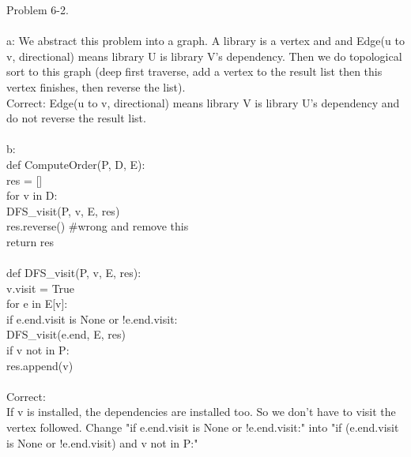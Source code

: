 \documentclass[12pt,twoside]{article}
\begin{document}
Problem 6-2.\\
\\
  a: We abstract this problem into a graph. A library is a vertex and
  and Edge(u to v, directional) means library U is library V's 
  dependency. Then we do topological sort to this graph (deep first 
  traverse, add a vertex to the result list then this vertex finishes,
  then reverse the list).\\
  Correct: Edge(u to v, directional) means library V is library U's 
  dependency and do not reverse the result list.\\
  \\
  b: \\
  \hspace*{2em}def ComputeOrder(P, D, E):\\
  \hspace*{4em}res = []\\
  \hspace*{4em}for v in D:\\
  \hspace*{6em}DFS\_visit(P, v, E, res)\\
  \hspace*{4em}res.reverse() \#wrong and remove this\\
  \hspace*{4em}return res\\
  \\
  \hspace*{2em}def DFS\_visit(P, v, E, res):\\
  \hspace*{4em}v.visit = True\\
  \hspace*{4em}for e in E[v]:\\
  \hspace*{6em}if e.end.visit is None or !e.end.visit:\\
  \hspace*{8em}DFS\_visit(e.end, E, res)\\
  \hspace*{4em}if v not in P:\\
  \hspace*{6em}res.append(v)\\
  \\
  Correct:\\
  If v is installed, the dependencies are installed too. So we don't have to visit
  the vertex followed. Change "if e.end.visit is None or !e.end.visit:" into
  "if (e.end.visit is None or !e.end.visit) and v not in P:"

  
\end{document}
